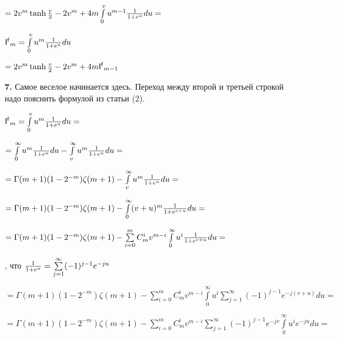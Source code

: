 \documentclass[a4paper,12pt]{article}
\begin{document}
\begin{center}
    $= 2v^m \operatorname{tanh}{v\over{2}} - 2v^m + 4m\int\limits_0^v u^{m - 1} {1\over{1 + e^{u}}}d u =$
\end{center}

 $\mathsf{I^f}_m = \int\limits_0^v u^{m} {1\over{1 + e^{u}}}d u$

\begin{center}
    $= 2v^m \operatorname{tanh}{v\over{2}} - 2v^m + 4m \mathsf{I^f}_{m - 1}$
\end{center}

\noindent\textbf{7.} Самое веселое начинается здесь. Переход между второй и третьей строкой надо пояснить формулой из статьи (2).

\begin{center}
    $\mathsf{I^f}_m = \int\limits_0^v u^{m} {1\over{1 + e^{u}}}d u =$
\end{center}

\begin{center}
    $= \int\limits_0^{\infty} u^{m} {1\over{1 + e^{u}}}d u - \int\limits_v^{\infty} u^{m} {1\over{1 + e^{u}}}d u =$
\end{center}

\begin{center}
    $= \Gamma(m + 1)(1 - 2^{- m})\zeta(m + 1) - \int\limits_v^{\infty} u^{m} {1\over{1 + e^{u}}}d u = $
\end{center}

\begin{center}
    $= \Gamma(m + 1)(1 - 2^{- m})\zeta(m + 1) - \int\limits_0^{\infty} (v + u)^{m} {1\over{1 + e^{v + u}}}d u = $
\end{center}

\begin{center}
    $= \Gamma(m + 1)(1 - 2^{- m})\zeta(m + 1) - \sum\limits_{i = 0}^m C_m^i v^{m - i} \int\limits_0^{\infty} u^{i} {1\over{1 + e^{v + u}}}d u = $
\end{center}

, что ${1\over{1 + e^{u}}} = \sum\limits_{j = 1}^{\infty} (-1)^{j - 1}e^{-j u}$

\begin{center}
    $= \Gamma(m + 1)(1 - 2^{- m})\zeta(m + 1) - \sum\limits_{i = 0}^m C_m^i v^{m - i} \int\limits_0^{\infty} u^{i} \sum\limits_{j = 1}^{\infty} (-1)^{j - 1}e^{-j(v + u)}d u = $
\end{center}

\begin{center}
    $= \Gamma(m + 1)(1 - 2^{- m})\zeta(m + 1) - \sum\limits_{i = 0}^m C_m^i v^{m - i} \sum\limits_{j = 1}^{\infty} (-1)^{j - 1}e^{-j v}\int\limits_0^{\infty} u^{i} e^{-j u}d u = $
\end{center}
\end{document}
